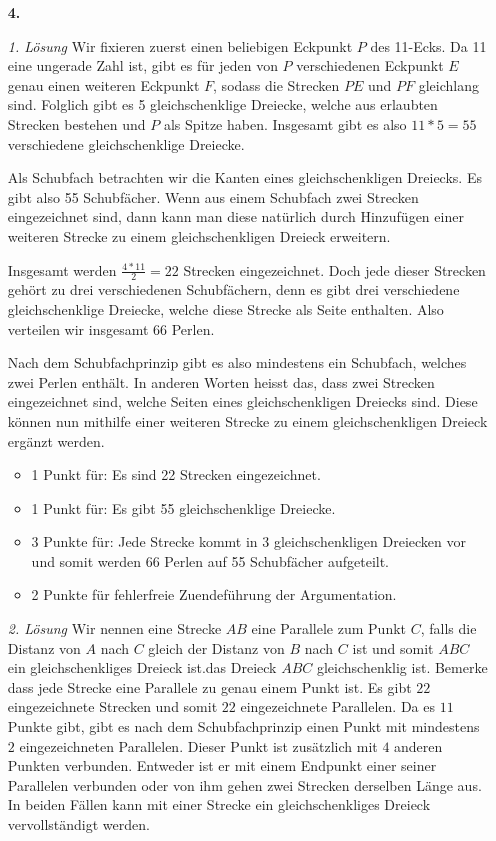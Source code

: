 \documentclass[12pt,a4paper]{article}
\theoremstyle{plain}
\theoremstyle{definition}
\theoremstyle{remark}
\begin{document}
\begin{enumerate}
\item[\textbf{4.}]


\textit{1. Lösung} Wir fixieren zuerst einen beliebigen Eckpunkt $P$ des 11-Ecks. Da 11 eine ungerade Zahl ist, gibt es für jeden von $P$ verschiedenen Eckpunkt $E$ genau einen weiteren Eckpunkt $F$, sodass die Strecken $PE$ und $PF$ gleichlang sind. Folglich gibt es 5 gleichschenklige Dreiecke, welche aus erlaubten Strecken bestehen und $P$ als Spitze haben. Insgesamt gibt es also $11*5 = 55$ verschiedene gleichschenklige Dreiecke.

Als Schubfach betrachten wir die Kanten eines gleichschenkligen Dreiecks. Es gibt also 55 Schubfächer. Wenn aus einem Schubfach zwei Strecken eingezeichnet sind, dann kann man diese natürlich durch Hinzufügen einer weiteren Strecke zu einem gleichschenkligen Dreieck erweitern.

Insgesamt werden $\frac{4*11}{2} = 22$ Strecken eingezeichnet. Doch jede dieser Strecken gehört zu drei verschiedenen Schubfächern, denn es gibt drei verschiedene gleichschenklige Dreiecke, welche diese Strecke als Seite enthalten. Also verteilen wir insgesamt 66 Perlen.

Nach dem Schubfachprinzip gibt es also mindestens ein Schubfach, welches zwei Perlen enthält. In anderen Worten heisst das, dass zwei Strecken eingezeichnet sind, welche Seiten eines gleichschenkligen Dreiecks sind. Diese können nun mithilfe einer weiteren Strecke zu einem gleichschenkligen Dreieck ergänzt werden.

\begin{itemize}
\item 1 Punkt für: Es sind 22 Strecken eingezeichnet.
\item 1 Punkt für: Es gibt 55 gleichschenklige Dreiecke.
\item 3 Punkte für: Jede Strecke kommt in 3 gleichschenkligen Dreiecken vor und somit werden 66 Perlen auf 55 Schubfächer aufgeteilt.
\item 2 Punkte für fehlerfreie Zuendeführung der Argumentation.
\end{itemize}
\textit{2. Lösung} Wir nennen eine Strecke $ AB$ eine Parallele zum Punkt $C$, falls die Distanz von $A$ nach $C$ gleich der Distanz von $B$ nach $C$ ist und somit $ABC$ ein gleichschenkliges Dreieck ist.das Dreieck $ABC$ gleichschenklig ist. Bemerke dass jede Strecke eine Parallele zu genau einem Punkt ist. Es gibt $22$ eingezeichnete Strecken und somit $22$ eingezeichnete Parallelen. Da es $11$ Punkte gibt, gibt es nach dem Schubfachprinzip einen Punkt mit mindestens $2$ eingezeichneten Parallelen. Dieser Punkt ist zusätzlich mit $4$ anderen Punkten verbunden. Entweder ist er mit einem Endpunkt einer seiner Parallelen verbunden oder von ihm gehen zwei Strecken derselben Länge aus. In beiden Fällen kann mit einer Strecke ein gleichschenkliges Dreieck vervollständigt werden.
\bigskip
\newpage


\end{enumerate}
\end{document}
